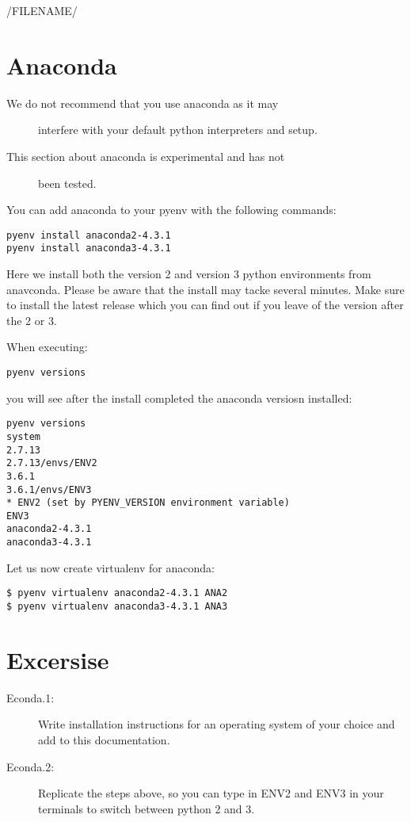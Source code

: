 /FILENAME/
\section{Anaconda}\label{anaconda}

\begin{description}
\item[We do not recommend that you use anaconda as it may]
interfere with your default python interpreters and setup.
\end{description}

\begin{description}
\item[This section about anaconda is experimental and has not]
been tested.
\end{description}

You can add anaconda to your pyenv with the following commands:

\begin{verbatim}
pyenv install anaconda2-4.3.1
pyenv install anaconda3-4.3.1
\end{verbatim}

Here we install both the version 2 and version 3 python environments
from anavconda. Please be aware that the install may tacke several
minutes. Make sure to install the latest release which you can find out
if you leave of the version after the 2 or 3.

When executing:

\begin{verbatim}
pyenv versions
\end{verbatim}

you will see after the install completed the anaconda versiosn
installed:

\begin{verbatim}
pyenv versions
system
2.7.13
2.7.13/envs/ENV2
3.6.1
3.6.1/envs/ENV3
* ENV2 (set by PYENV_VERSION environment variable)
ENV3
anaconda2-4.3.1
anaconda3-4.3.1
\end{verbatim}

Let us now create virtualenv for anaconda:

\begin{verbatim}
$ pyenv virtualenv anaconda2-4.3.1 ANA2
$ pyenv virtualenv anaconda3-4.3.1 ANA3
\end{verbatim}

\section{Excersise}\label{excersise}

\begin{description}
\item[Econda.1:]
Write installation instructions for an operating system of your choice
and add to this documentation.
\item[Econda.2:]
Replicate the steps above, so you can type in ENV2 and ENV3 in your
terminals to switch between python 2 and 3.
\end{description}
